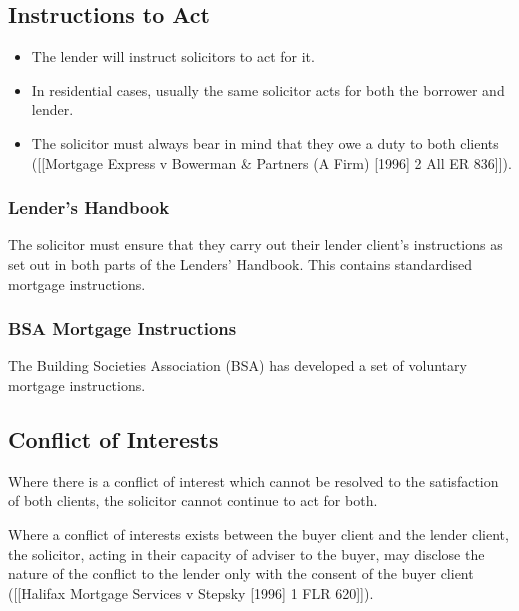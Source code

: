 \documentclass[
]{article}
\providecommand{\tightlist}{%
  \setlength{\itemsep}{0pt}\setlength{\parskip}{0pt}}
\begin{document}
\hypertarget{instructions-to-act}{%
\subsection{Instructions to Act}\label{instructions-to-act}}

\begin{itemize}
\tightlist
\item
  The lender will instruct solicitors to act for it.
\item
  In residential cases, usually the same solicitor acts for both the
  borrower and lender.
\item
  The solicitor must always bear in mind that they owe a duty to both
  clients ({[}{[}Mortgage Express v Bowerman \& Partners (A Firm)
  {[}1996{]} 2 All ER 836{]}{]}).
\end{itemize}

\hypertarget{lenders-handbook}{%
\subsubsection{Lender's Handbook}\label{lenders-handbook}}

The solicitor must ensure that they carry out their lender client's
instructions as set out in both parts of the Lenders' Handbook. This
contains standardised mortgage instructions.

\hypertarget{bsa-mortgage-instructions}{%
\subsubsection{BSA Mortgage
Instructions}\label{bsa-mortgage-instructions}}

The Building Societies Association (BSA) has developed a set of
voluntary mortgage instructions.

\hypertarget{conflict-of-interests}{%
\subsection{Conflict of Interests}\label{conflict-of-interests}}

Where there is a conflict of interest which cannot be resolved to the
satisfaction of both clients, the solicitor cannot continue to act for
both.

Where a conflict of interests exists between the buyer client and the
lender client, the solicitor, acting in their capacity of adviser to the
buyer, may disclose the nature of the conflict to the lender only with
the consent of the buyer client ({[}{[}Halifax Mortgage Services v
Stepsky {[}1996{]} 1 FLR 620{]}{]}).
\end{document}
